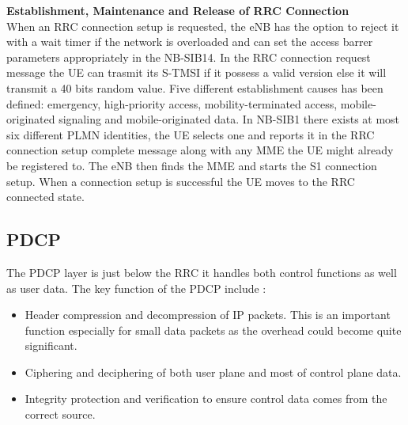 \textbf{Establishment, Maintenance and Release of \gls{RRC} Connection} \\
When an \gls{RRC} connection setup is requested, the \gls{eNB} has the option to reject it with a wait timer if the network is overloaded and can set the access barrer parameters appropriately in the \gls{NB-SIB}14. In the \gls{RRC} connection request message the \gls{UE} can trasmit its \gls{S-TMSI} if it possess a valid version else it will transmit a 40 bits random value. Five different establishment causes has been defined: emergency, high-priority access, mobility-terminated access, mobile-originated signaling and mobile-originated data. In \gls{NB-SIB}1 there exists at most six different \gls{PLMN} identities, the \gls{UE} selects one and reports it in the  \gls{RRC} connection setup complete message along with any \gls{MME} the \gls{UE} might already be registered to. The \gls{eNB} then finds the \gls{MME} and starts the S1 connection setup. When a connection setup is successful the \gls{UE} moves to the \gls{RRC} connected state. \citep[ch. 6.6]{book_LTE_for_UMTS}





\subsection{PDCP}
The \gls{PDCP} layer is just below the \gls{RRC} it handles both control functions as well as user data. The key function of the \gls{PDCP} include \citep[ch. 6.5]{book_LTE_for_UMTS}:
\begin{itemize}
	\item Header compression and decompression of \gls{IP} packets. This is an important function especially for small data packets as the overhead could become quite significant.
	\item Ciphering and deciphering of both user plane and most of control plane data.
	\item Integrity protection and verification to ensure control data comes from the correct source.
\end{itemize}

